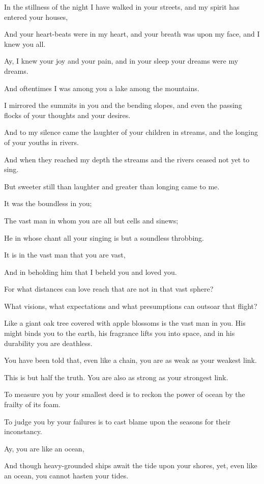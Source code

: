 In the stillness of the night I have
walked in your streets, and my spirit
has entered your houses,

And your heart-beats were in my heart,
and your breath was upon my face, and I
knew you all.

Ay, I knew your joy and your pain,
and in your sleep your dreams were my
dreams.

And oftentimes I was among you a lake
among the mountains.

I mirrored the summits in you and the
bending slopes, and even the
passing flocks of your thoughts and your
desires.

And to my silence came the laughter
of your children in streams, and the
longing of your youths in rivers.

And when they reached my depth the
streams and the rivers ceased not yet to
sing.


But sweeter still than laughter and
greater than longing came to me.

It was the boundless in you;

The vast man in whom you are all but
cells and sinews;

He in whose chant all your singing is
but a soundless throbbing.

It is in the vast man that you are vast,

And in beholding him that I beheld you
and loved you.

For what distances can love reach that
are not in that vast sphere?

What visions, what expectations and what
presumptions can outsoar that flight?

Like a giant oak tree covered with apple
blossoms is the vast man in you. His
might binds you to the earth, his
fragrance lifts you into space, and in
his durability you are deathless.

You have been told that, even like a
chain, you are as weak as your weakest
link.

This is but half the truth. You are also
as strong as your strongest link.

To measure you by your smallest deed
is to reckon the power of ocean by the
frailty of its foam.

To judge you by your failures is to
cast blame upon the seasons for their
inconstancy.

Ay, you are like an ocean,

And though heavy-grounded ships await
the tide upon your shores, yet, even
like an ocean, you cannot hasten your
tides.

